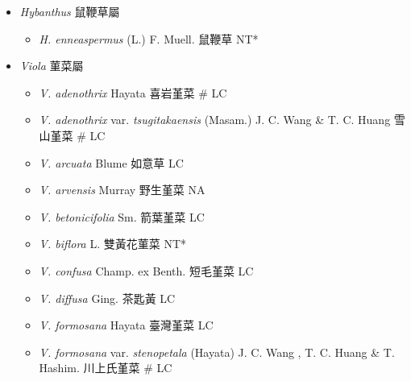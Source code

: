 
  \begin{itemize}
 \item[] \textit{Hybanthus} 鼠鞭草屬
                                
  \begin{itemize}
        \item[] \textit{H. enneaspermus} (L.) F. Muell.  鼠鞭草   NT*
  \end{itemize}
 \item[] \textit{Viola} 菫菜屬
                                
  \begin{itemize}
        \item[] \textit{V. adenothrix} Hayata  喜岩堇菜  \# LC
        \item[] \textit{V. adenothrix} var. \textit{tsugitakaensis} (Masam.) J. C. Wang \& T. C. Huang  雪山堇菜  \# LC
        \item[] \textit{V. arcuata} Blume  如意草   LC
        \item[] \textit{V. arvensis} Murray  野生堇菜   NA
        \item[] \textit{V. betonicifolia} Sm.  箭葉堇菜   LC
        \item[] \textit{V. biflora} L.  雙黃花菫菜   NT*
        \item[] \textit{V. confusa} Champ. ex Benth.  短毛堇菜   LC
        \item[] \textit{V. diffusa} Ging.  茶匙黃   LC
        \item[] \textit{V. formosana} Hayata  臺灣堇菜   LC
        \item[] \textit{V. formosana} var. \textit{stenopetala} (Hayata) J. C. Wang , T. C. Huang \& T. Hashim.  川上氏堇菜  \# LC

\end{itemize}
\end{itemize}
